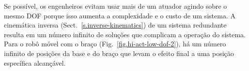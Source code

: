 {%

Se possível, os engenheiros evitam usar mais de um atuador agindo sobre o mesmo DOF porque isso aumenta a complexidade e o custo de um sistema. A cinemática inversa (Sect.~\ref{s.inverse-kinematics}) de um sistema redundante resulta em um número infinito de soluções que complicam a operação do sistema. Para o robô móvel com o braço (Fig.~\ref{fig.hi-act-low-dof-2}), há um número infinito de posições da base e do braço que levam o efeito final a uma posição específica alcançável.

}
